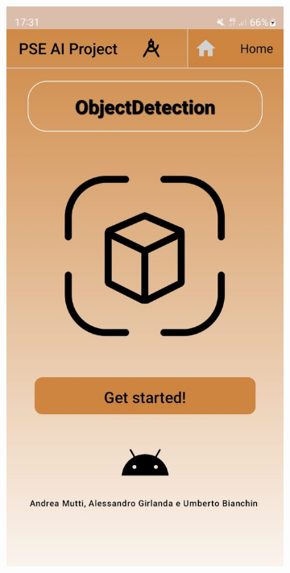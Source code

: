 \begin{figure}[ht]
    \centering
    \begin{subfigure}[b]{0.3\textwidth}
      \includegraphics[width=\textwidth, height=0.45\textheight]{Immagini/App/home_chiaro.jpeg}

\end{subfigure}
\end{figure}
